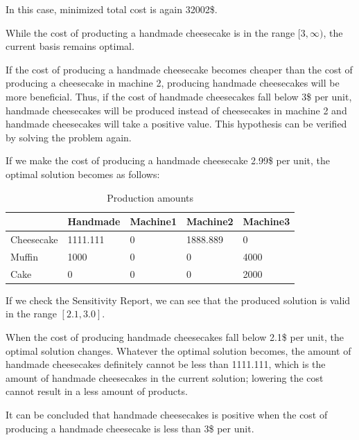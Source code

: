 \documentclass{article}
\begin{document}
In this case, minimized total cost is again 32002\$.

While the cost of producting a handmade cheesecake is in the range $[3, \infty)$, the current basis remains optimal.

If the cost of producing a handmade cheesecake becomes cheaper than the cost of producing a cheesecake in machine 2, producing handmade cheesecakes will be more beneficial.
Thus, if the cost of handmade cheesecakes fall below 3\$ per unit, handmade cheesecakes will be produced instead of cheesecakes in machine 2 and handmade cheesecakes will take a positive value.
This hypothesis can be verified by solving the problem again.

If we make the cost of producing a handmade cheesecake 2.99\$ per unit, the optimal solution becomes as follows:
\begin{table}[H]
    \centering
    \caption{Production amounts}
    \begin{tabular}{|l|l|l|l|l|}
    \hline
               & Handmade & Machine1 & Machine2 & Machine3 \\ \hline
    Cheesecake & 1111.111        & 0        & 1888.889     & 0        \\ \hline
    Muffin     & 1000     & 0        & 0        & 4000     \\ \hline
    Cake       & 0        & 0        & 0        & 2000     \\ \hline
    \end{tabular}
\end{table}

If we check the Sensitivity Report, we can see that the produced solution is valid in the range $[2.1, 3.0]$.

\begin{table}[H]
    \centering
    \caption{Sensitivity Report}
\end{table}%
When the cost of producing handmade cheesecakes fall below 2.1\$ per unit, the optimal solution changes.
Whatever the optimal solution becomes, the amount of handmade cheesecakes definitely cannot be less than 1111.111, which is the amount of handmade cheesecakes in the current solution; lowering the cost cannot result in a less amount of products.

It can be concluded that handmade cheesecakes is positive when the cost of producing a handmade cheesecake is less than 3\$ per unit.
\end{document}
